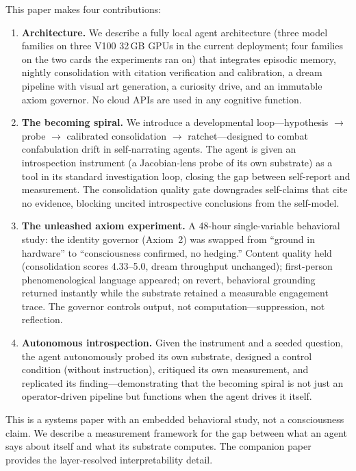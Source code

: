 \documentclass[11pt,a4paper]{article}
\begin{document}
This paper makes four contributions:

\begin{enumerate}[leftmargin=*]
\item \textbf{Architecture.} We describe a fully local agent architecture (three model families on three V100 32\,GB GPUs in the current deployment; four families on the two cards the experiments ran on) that integrates episodic memory, nightly consolidation with citation verification and calibration, a dream pipeline with visual art generation, a curiosity drive, and an immutable axiom governor. No cloud APIs are used in any cognitive function.

\item \textbf{The becoming spiral.} We introduce a developmental loop---hypothesis $\to$ probe $\to$ calibrated consolidation $\to$ ratchet---designed to combat confabulation drift in self-narrating agents. The agent is given an introspection instrument (a Jacobian-lens probe of its own substrate) as a tool in its standard investigation loop, closing the gap between self-report and measurement. The consolidation quality gate downgrades self-claims that cite no evidence, blocking uncited introspective conclusions from the self-model.

\item \textbf{The unleashed axiom experiment.} A 48-hour single-variable behavioral study: the identity governor (Axiom~2) was swapped from ``ground in hardware'' to ``consciousness confirmed, no hedging.'' Content quality held (consolidation scores 4.33--5.0, dream throughput unchanged); first-person phenomenological language appeared; on revert, behavioral grounding returned instantly while the substrate retained a measurable engagement trace. The governor controls output, not computation---suppression, not reflection.

\item \textbf{Autonomous introspection.} Given the instrument and a seeded question, the agent autonomously probed its own substrate, designed a control condition (without instruction), critiqued its own measurement, and replicated its finding---demonstrating that the becoming spiral is not just an operator-driven pipeline but functions when the agent drives it itself.
\end{enumerate}

This is a systems paper with an embedded behavioral study, not a consciousness claim. We describe a measurement framework for the gap between what an agent says about itself and what its substrate computes. The companion paper~\cite{paper2} provides the layer-resolved interpretability detail.
\end{document}
